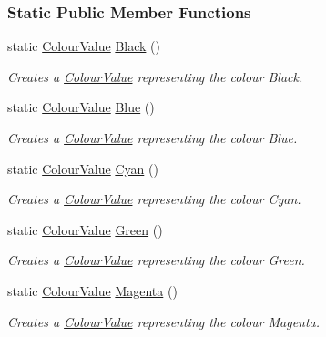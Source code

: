 \subsubsection*{Static Public Member Functions}
\begin{DoxyCompactItemize}
\item 
static \hyperlink{classMezzanine_1_1ColourValue}{ColourValue} \hyperlink{classMezzanine_1_1ColourValue_a07482f09f118de47519a862fd190a9f8}{Black} ()
\begin{DoxyCompactList}\small\item\em Creates a \hyperlink{classMezzanine_1_1ColourValue}{ColourValue} representing the colour Black. \item\end{DoxyCompactList}\item 
static \hyperlink{classMezzanine_1_1ColourValue}{ColourValue} \hyperlink{classMezzanine_1_1ColourValue_aaad55c22ddce89cee754a06d674c0b51}{Blue} ()
\begin{DoxyCompactList}\small\item\em Creates a \hyperlink{classMezzanine_1_1ColourValue}{ColourValue} representing the colour Blue. \item\end{DoxyCompactList}\item 
static \hyperlink{classMezzanine_1_1ColourValue}{ColourValue} \hyperlink{classMezzanine_1_1ColourValue_a64cbddd02ae19f551796a4669a94783f}{Cyan} ()
\begin{DoxyCompactList}\small\item\em Creates a \hyperlink{classMezzanine_1_1ColourValue}{ColourValue} representing the colour Cyan. \item\end{DoxyCompactList}\item 
static \hyperlink{classMezzanine_1_1ColourValue}{ColourValue} \hyperlink{classMezzanine_1_1ColourValue_a42d1f48b74ca68a09730c1bd520f53ab}{Green} ()
\begin{DoxyCompactList}\small\item\em Creates a \hyperlink{classMezzanine_1_1ColourValue}{ColourValue} representing the colour Green. \item\end{DoxyCompactList}\item 
static \hyperlink{classMezzanine_1_1ColourValue}{ColourValue} \hyperlink{classMezzanine_1_1ColourValue_a4ce7bff5fbca271d3b83664098dcddb3}{Magenta} ()
\begin{DoxyCompactList}\small\item\em Creates a \hyperlink{classMezzanine_1_1ColourValue}{ColourValue} representing the colour Magenta. \item\end{DoxyCompactList}\item 

\end{DoxyCompactItemize}
